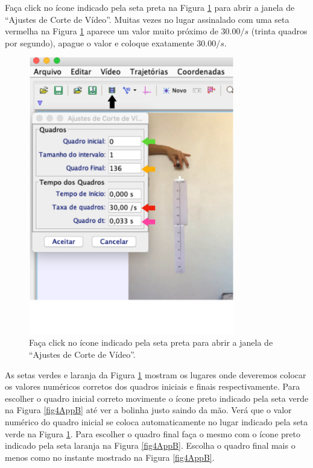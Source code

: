 \documentclass[12pt]{article}
\begin{document}
Faça click no ícone indicado pela seta preta na Figura \ref{fig3AppB} para abrir a janela de 
``Ajustes de Corte de Vídeo''. Muitas vezes no lugar assinalado com uma seta vermelha na Figura
\ref{fig3AppB} aparece um valor muito próximo de $30.00/s$ (trinta quadros por segundo), apague o valor e coloque exatamente  $30.00/s$.
\begin{figure}[h!]
\includegraphics[width=9cm]{fig3AppB.pdf}
\caption{Faça click no ícone indicado pela seta preta para abrir a janela de 
``Ajustes de Corte de Vídeo''.}
\label{fig3AppB}
\end{figure}
As setas verdes e laranja da Figura \ref{fig3AppB} mostram os lugares onde deveremos 
colocar os valores numéricos corretos dos quadros iniciais e finais respectivamente.
Para escolher o quadro inicial correto movimente o ícone preto indicado pela seta verde na Figura 
\ref{fig4AppB} até ver a bolinha justo saindo da mão. Verá que o valor numérico do quadro inicial 
se coloca automaticamente no lugar indicado pela seta verde na Figura \ref{fig3AppB}. Para escolher 
o quadro final faça o mesmo com o ícone preto indicado pela seta laranja na  Figura 
\ref{fig4AppB}. Escolha o quadro final mais o menos como no instante mostrado na  Figura 
\ref{fig4AppB}.
\end{document}
